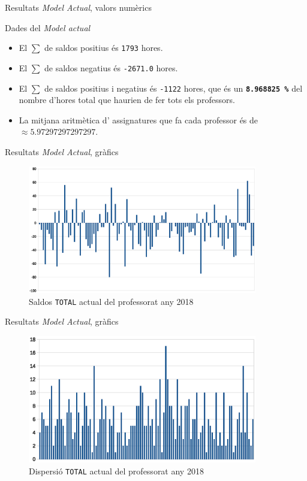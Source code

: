 \documentclass[twocolumn]{beamer}
\begin{document}
\begin{frame}{Resultats \textit{Model Actual}, valors numèrics }

\begin{block}{Dades del \textit{Model actual}}
	\begin{itemize}
		\item El $\sum$ de saldos positius és \texttt{1793} hores.	
		\item El $\sum$ de saldos negatius és \texttt{-2671.0} hores.	
		\item El $\sum$ de saldos positius i negatius  és \texttt{-1122} hores, que és un \texttt{\textbf{8.968825 \%}} del nombre d'hores total que haurien de fer tots els professors.
		\item La mitjana aritmètica d' assignatures que fa cada professor és de  $\approx 5.97297297297297$. 
	\end{itemize}
\end{block}
\end{frame}





\begin{frame}{Resultats \textit{Model Actual}, gràfics}
\begin{figure}
	\includegraphics[width=10cm]{saldo_actual}
	\caption{Saldos \texttt{TOTAL} actual del professorat any 2018}
\end{figure}
\end{frame}


\begin{frame}{Resultats \textit{Model Actual}, gràfics}
\begin{figure}
	\includegraphics[width=10cm]{dispersio_actual}
	\caption{Dispersió \texttt{TOTAL} actual del professorat any 2018}
\end{figure}
\end{frame}
\end{document}
